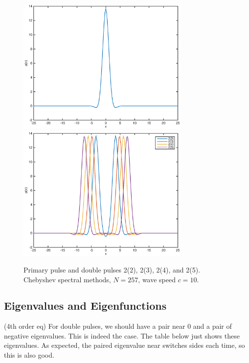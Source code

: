 \documentclass[12pt]{article}
\begin{document}
\begin{figure}[H]
	\includegraphics[width=8.5cm]{cheb10primary.eps}
	\includegraphics[width=8.5cm]{cheb10double}
		\caption{Primary pulse and double pulses 2(2), 2(3), 2(4), and 2(5). Chebyshev spectral methods, $N = 257$, wave speed $c = 10$. }
\end{figure}

\subsection{Eigenvalues and Eigenfunctions}

(4th order eq) For double pulses, we should have a pair near 0 and a pair of negative eigenvalues. This is indeed the case. The table below just shows these eigenvalues. As expected, the paired eigenvalue near switches sides each time, so this is also good.
\end{document}
